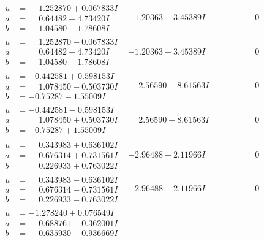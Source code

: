 \documentclass[1p]{elsarticle_modified}
\theoremstyle{definition}
\begin{document}
$$\begin{array}{c|c|c}
\begin{aligned}
u &= \phantom{-}1.252870 + 0.067833 I \\
a &= \phantom{-}0.64482 - 4.73420 I \\
b &= \phantom{-}1.04580 - 1.78608 I\end{aligned}
 & -1.20363 - 3.45389 I & \phantom{-0.000000 } 0 \\ \hline\begin{aligned}
u &= \phantom{-}1.252870 - 0.067833 I \\
a &= \phantom{-}0.64482 + 4.73420 I \\
b &= \phantom{-}1.04580 + 1.78608 I\end{aligned}
 & -1.20363 + 3.45389 I & \phantom{-0.000000 } 0 \\ \hline\begin{aligned}
u &= -0.442581 + 0.598153 I \\
a &= \phantom{-}1.078450 - 0.503730 I \\
b &= -0.75287 - 1.55009 I\end{aligned}
 & \phantom{-}2.56590 + 8.61563 I & \phantom{-0.000000 } 0 \\ \hline\begin{aligned}
u &= -0.442581 - 0.598153 I \\
a &= \phantom{-}1.078450 + 0.503730 I \\
b &= -0.75287 + 1.55009 I\end{aligned}
 & \phantom{-}2.56590 - 8.61563 I & \phantom{-0.000000 } 0 \\ \hline\begin{aligned}
u &= \phantom{-}0.343983 + 0.636102 I \\
a &= \phantom{-}0.676314 + 0.731561 I \\
b &= \phantom{-}0.226933 + 0.763022 I\end{aligned}
 & -2.96488 - 2.11966 I & \phantom{-0.000000 } 0 \\ \hline\begin{aligned}
u &= \phantom{-}0.343983 - 0.636102 I \\
a &= \phantom{-}0.676314 - 0.731561 I \\
b &= \phantom{-}0.226933 - 0.763022 I\end{aligned}
 & -2.96488 + 2.11966 I & \phantom{-0.000000 } 0 \\ \hline\begin{aligned}
u &= -1.278240 + 0.076549 I \\
a &= \phantom{-}0.688761 - 0.362001 I \\
b &= \phantom{-}0.635930 - 0.936669 I\end{aligned}

\end{array}$$
\end{document}
